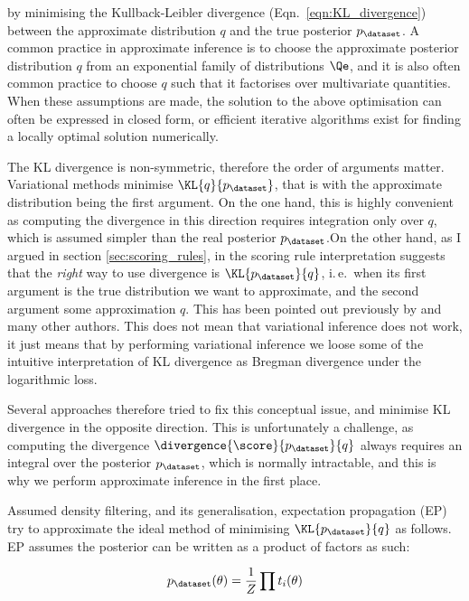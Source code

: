 by minimising the Kullback-Leibler divergence (Eqn.\ \eqref{eqn:KL_divergence}) between the approximate distribution $q$ and the true posterior $p_{\dataset}$. A common practice in approximate inference is to choose the approximate posterior distribution $q$ from an exponential family of distributions $\Qe$, and it is also often common practice to choose $q$ such that it factorises over multivariate quantities. When these assumptions are made, the solution to the above optimisation can often be expressed in closed form, or efficient iterative algorithms exist for finding a locally optimal solution numerically.

The KL divergence is non-symmetric, therefore the order of arguments matter. Variational methods minimise $\KL{q}{p_{\dataset}}$, that is with the approximate distribution being the first argument. On the one hand, this is highly convenient as computing the divergence in this direction requires integration only over $q$, which is assumed simpler than the real posterior $p_{\dataset}$.On the other hand, as I argued in section \ref{sec:scoring_rules}, in the scoring rule interpretation suggests that the \emph{right} way to use divergence is $\KL{p_{\dataset}}{q}$, i.\,e.\ when its first argument is the true distribution we want to approximate, and the second argument some approximation $q$. This has been pointed out previously by \citep{Csato2002,Minka2001} and many other authors. This does not mean that variational inference does not work, it just means that by performing variational inference we loose some of the intuitive interpretation of KL divergence as Bregman divergence under the logarithmic loss.

Several approaches therefore tried to fix this conceptual issue, and minimise KL divergence in the opposite direction. This is unfortunately a challenge, as computing the divergence $\divergence{\score}{p_{\dataset}}{q}$ always requires an integral over the posterior $p_{\dataset}$, which is normally intractable, and this is why we perform approximate inference in the first place.

Assumed density filtering, and its generalisation, expectation propagation (EP) try to approximate the ideal method of minimising $\KL{p_{\dataset}}{q}$ as follows. EP assumes the posterior can be written as a product of factors as such:

\begin{equation}
	p_{\dataset}(\theta) = \frac{1}{Z} \prod t_i(\theta)
\end{equation}

